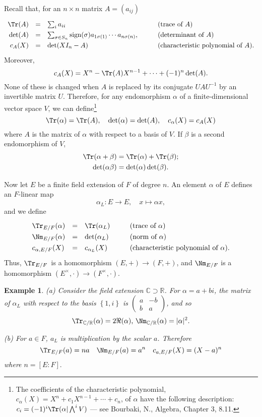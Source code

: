 \documentclass[a4paper,11pt,final,openany]{memoir}
\newtheorem{example}[X]{Example}
\theoremstyle{nonumberplain}
\begin{document}
Recall that, for an $n\times n$ matrix $A=(a_{ij})$
\[
\renewcommand{\arraystretch}{1.3}
\begin{array}
[c]{rcll}%
\Tr(A) & = & \sum\nolimits_{i}a_{ii}\quad\quad & \text{(trace of }A\text{)}\\
\det(A) & = & \sum\nolimits_{\sigma\in S_{n}}\text{sign}(\sigma)a_{1\sigma
(1)}\cdots a_{n\sigma(n)},\quad\quad & \text{(determinant of }A\text{)}\\
c_{A}(X) & = & \det(XI_{n}-A)\quad\quad & \text{(characteristic polynomial of
}A\text{).}%
\end{array}
\]
Moreover,%
\[
c_{A}(X)=X^{n}-\Tr(A)X^{n-1}+\cdots+(-1)^{n}\det(A)\text{.}%
\]
None of these is changed when $A$ is replaced by its conjugate $UAU^{-1}$ by
an invertible matrix $U$. Therefore, for any endomorphism $\alpha$ of a
finite-dimensional vector space $V$, we can define\footnote{The coefficients
of the characteristic polynomial, $c_{\alpha}(X)=X^{n}+c_{1}X^{n-1}%
+\cdots+c_{n}$, of $\alpha$ have the following description: $c_{i}%
=(-1)^{i}\Tr(\alpha|\bigwedge\nolimits^{i}V)$ --- see Bourbaki, N., Algebra,
Chapter 3, 8.11.}%
\[
\Tr(\alpha)=\Tr(A),\quad\det(\alpha)=\det(A),\quad c_{\alpha}(X)=c_{A}(X)
\]
where $A$ is the matrix of $\alpha$ with respect to a basis of $V$. If $\beta$
is a second endomorphism of $V$,
\begin{align*}
\Tr(\alpha+\beta)  &  =\Tr(\alpha)+\Tr(\beta);\\
\quad\det(\alpha\beta)  &  =\det(\alpha)\det(\beta).
\end{align*}


Now let $E$ be a finite field extension of $F$ of degree $n.$ An element
$\alpha$ of $E$ defines an $F$-linear map
\[
\alpha_{L}\colon E\rightarrow E,\quad x\mapsto\alpha x,
\]
and we define%
%
%
\[
\renewcommand{\arraystretch}{1.3}
\begin{array}
[c]{llll}%
\Tr_{E/F}(\alpha) & = & \Tr(\alpha_{L}) & \text{(trace of }\alpha\text{)}\\
\Nm_{E/F}(\alpha) & = & \det(\alpha_{L})\quad\quad & \text{(norm of }%
\alpha\text{)}\\
c_{\alpha,E/F}(X) & = & c_{\alpha_{L}}(X) & \text{(characteristic polynomial
of }\alpha\text{)}.
\end{array}
\]
Thus, $\Tr_{E/F}$\ is a homomorphism $(E,+)\rightarrow(F,+)$, and $\Nm_{E/F}$
is a homomorphism $(E^{\times},\cdot)\rightarrow(F^{\times},\cdot)$.

\begin{example}
\label{ag32}(a) Consider the field extension $\mathbb{C}\supset\mathbb{R}$.
For $\alpha=a+bi$, the matrix of $\alpha_{L}$ with respect to the basis
$\left\{  1,i\right\}  $ is $\left(
\begin{smallmatrix}
a & -b\\
b & a
\end{smallmatrix}
\right)  $, and so
\[
\Tr_{\mathbb{C}/\mathbb{R}}(\alpha)=2\Re(\alpha)\text{, }\Nm_{\mathbb{C}%
/\mathbb{R}}(\alpha)=|\alpha|^{2}.
\]


(b) For $a\in F$, $a_{L}$ is multiplication by the scalar $a$. Therefore%
\[
\Tr_{E/F}(a)=na\quad\Nm_{E/F}(a)=a^{n}\quad c_{a,E/F}(X)=(X-a)^{n}%
\]
where $n=[E\colon F].$
\end{example}
\end{document}
